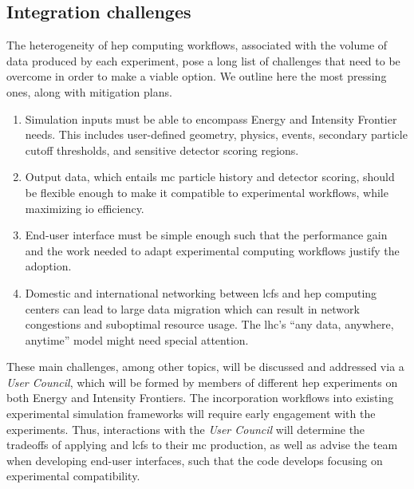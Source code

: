 \subsection{Integration challenges}

The heterogeneity of \ac{hep} computing workflows, associated with the volume of
data produced by each experiment, pose a long list of challenges that need to be
overcome in order to make \celeritas a viable option. We outline here the most
pressing ones, along with mitigation plans.
\begin{enumerate}[itemsep=0pt]
  \item Simulation inputs must be able to encompass Energy and Intensity
    Frontier needs. This includes user-defined geometry, physics, events,
    secondary particle cutoff thresholds, and sensitive detector scoring
    regions.
  \item Output data, which entails \ac{mc} particle history and detector
    scoring, should be flexible enough to make it compatible to experimental
    workflows, while maximizing \ac{io} efficiency.
  \item End-user interface must be simple enough such that the performance gain
    and the work needed to adapt experimental computing workflows justify the
    adoption.
  \item Domestic and international networking between \acp{lcf} and \ac{hep}
    computing centers can lead to large data migration which can result in
    network congestions and suboptimal resource usage.  The \ac{lhc}'s ``any
    data, anywhere, anytime'' model \cite{hep-network-requirements} might need
    special attention.
\end{enumerate}

These main challenges, among other topics, will be discussed and addressed via a
\celeritas \emph{User Council}, which will be formed by members of different
\ac{hep} experiments on both Energy and Intensity Frontiers. The incorporation
\celeritas workflows into existing experimental simulation frameworks will
require early engagement with the experiments. Thus, interactions with the
\emph{User Council} will determine the tradeoffs of applying \celeritas and
\acp{lcf} to their \ac{mc} production, as well as advise the \celeritas team
when developing end-user interfaces, such that the code develops focusing on
experimental compatibility.

